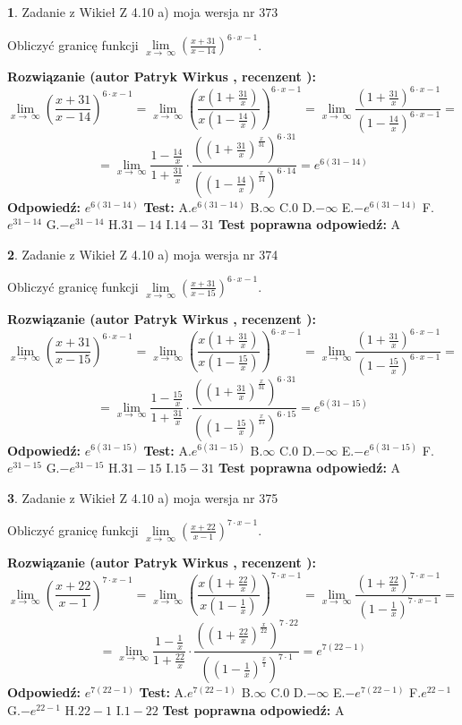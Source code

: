 \documentclass[12pt, a4paper]{article}
\theoremstyle{definition} %
\newtheorem{zad}{}
\newcommand{\zadStart}[1]{\begin{zad}#1\newline}
\newcommand{\zadStop}{\end{zad}}
\newcommand{\rozwStart}[2]{\noindent \textbf{Rozwiązanie (autor #1 , recenzent #2): }\newline}
\newcommand{\rozwStop}{\newline}
\newcommand{\odpStart}{\noindent \textbf{Odpowiedź:}\newline}
\newcommand{\odpStop}{\newline}
\newcommand{\testStart}{\noindent \textbf{Test:}\newline}
\newcommand{\testStop}{\newline}
\newcommand{\kluczStart}{\noindent \textbf{Test poprawna odpowiedź:}\newline}
\newcommand{\kluczStop}{\newline}
\begin{document}
\zadStart{Zadanie z Wikieł Z 4.10 a) moja wersja nr 373}


Obliczyć granicę funkcji  $\lim\limits_{x\to\ \infty}(\frac{x+31}{x-14})^{6\cdot x-1}$.
\zadStop
\rozwStart{Patryk Wirkus}{}
$$\lim\limits_{x\to\ \infty}(\frac{x+31}{x-14})^{6\cdot x-1} = \lim\limits_{x\to\ \infty}(\frac{x(1+\frac{31}{x})}{x(1-\frac{14}{x})})^{6\cdot x-1}=\lim\limits_{x\to\ \infty}\frac{(1+\frac{31}{x})^{6\cdot x-1}}{(1-\frac{14}{x})^{6\cdot x-1}}=$$
$$=\lim\limits_{x\to\ \infty}\frac{1-\frac{14}{x}}{1+\frac{31}{x}}\cdot\frac{((1+\frac{31}{x})^{\frac{x}{31}})^{6\cdot31}}{((1-\frac{14}{x})^{\frac{x}{14}})^{6\cdot14}}=e^{6(31-14)}$$
\rozwStop
\odpStart
$e^{6(31-14)}$
\odpStop
\testStart
A.$e^{6(31-14)}$ B.$\infty$ C.$0$ D.$-\infty$ E.$-e^{6(31-14)}$
F.$e^{31-14}$ G.$-e^{31-14}$
H.$31-14$
I.$14-31$
\testStop
\kluczStart
A
\kluczStop



\zadStart{Zadanie z Wikieł Z 4.10 a) moja wersja nr 374}


Obliczyć granicę funkcji  $\lim\limits_{x\to\ \infty}(\frac{x+31}{x-15})^{6\cdot x-1}$.
\zadStop
\rozwStart{Patryk Wirkus}{}
$$\lim\limits_{x\to\ \infty}(\frac{x+31}{x-15})^{6\cdot x-1} = \lim\limits_{x\to\ \infty}(\frac{x(1+\frac{31}{x})}{x(1-\frac{15}{x})})^{6\cdot x-1}=\lim\limits_{x\to\ \infty}\frac{(1+\frac{31}{x})^{6\cdot x-1}}{(1-\frac{15}{x})^{6\cdot x-1}}=$$
$$=\lim\limits_{x\to\ \infty}\frac{1-\frac{15}{x}}{1+\frac{31}{x}}\cdot\frac{((1+\frac{31}{x})^{\frac{x}{31}})^{6\cdot31}}{((1-\frac{15}{x})^{\frac{x}{15}})^{6\cdot15}}=e^{6(31-15)}$$
\rozwStop
\odpStart
$e^{6(31-15)}$
\odpStop
\testStart
A.$e^{6(31-15)}$ B.$\infty$ C.$0$ D.$-\infty$ E.$-e^{6(31-15)}$
F.$e^{31-15}$ G.$-e^{31-15}$
H.$31-15$
I.$15-31$
\testStop
\kluczStart
A
\kluczStop



\zadStart{Zadanie z Wikieł Z 4.10 a) moja wersja nr 375}


Obliczyć granicę funkcji  $\lim\limits_{x\to\ \infty}(\frac{x+22}{x-1})^{7\cdot x-1}$.
\zadStop
\rozwStart{Patryk Wirkus}{}
$$\lim\limits_{x\to\ \infty}(\frac{x+22}{x-1})^{7\cdot x-1} = \lim\limits_{x\to\ \infty}(\frac{x(1+\frac{22}{x})}{x(1-\frac{1}{x})})^{7\cdot x-1}=\lim\limits_{x\to\ \infty}\frac{(1+\frac{22}{x})^{7\cdot x-1}}{(1-\frac{1}{x})^{7\cdot x-1}}=$$
$$=\lim\limits_{x\to\ \infty}\frac{1-\frac{1}{x}}{1+\frac{22}{x}}\cdot\frac{((1+\frac{22}{x})^{\frac{x}{22}})^{7\cdot22}}{((1-\frac{1}{x})^{\frac{x}{1}})^{7\cdot1}}=e^{7(22-1)}$$
\rozwStop
\odpStart
$e^{7(22-1)}$
\odpStop
\testStart
A.$e^{7(22-1)}$ B.$\infty$ C.$0$ D.$-\infty$ E.$-e^{7(22-1)}$
F.$e^{22-1}$ G.$-e^{22-1}$
H.$22-1$
I.$1-22$
\testStop
\kluczStart
A
\kluczStop
\end{document}
